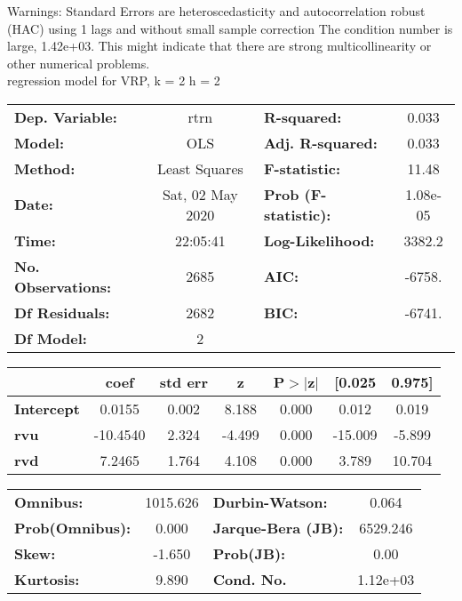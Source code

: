 Warnings: \newline
 [1] Standard Errors are heteroscedasticity and autocorrelation robust (HAC) using 1 lags and without small sample correction \newline
 [2] The condition number is large, 1.42e+03. This might indicate that there are \newline
 strong multicollinearity or other numerical problems.\\ 

regression model for VRP, k = 2 h = 2\begin{center}
\begin{tabular}{lclc}
\toprule
\textbf{Dep. Variable:}    &       rtrn       & \textbf{  R-squared:         } &     0.033   \\
\textbf{Model:}            &       OLS        & \textbf{  Adj. R-squared:    } &     0.033   \\
\textbf{Method:}           &  Least Squares   & \textbf{  F-statistic:       } &     11.48   \\
\textbf{Date:}             & Sat, 02 May 2020 & \textbf{  Prob (F-statistic):} &  1.08e-05   \\
\textbf{Time:}             &     22:05:41     & \textbf{  Log-Likelihood:    } &    3382.2   \\
\textbf{No. Observations:} &        2685      & \textbf{  AIC:               } &    -6758.   \\
\textbf{Df Residuals:}     &        2682      & \textbf{  BIC:               } &    -6741.   \\
\textbf{Df Model:}         &           2      & \textbf{                     } &             \\
\bottomrule
\end{tabular}
\begin{tabular}{lcccccc}
                   & \textbf{coef} & \textbf{std err} & \textbf{z} & \textbf{P$> |$z$|$} & \textbf{[0.025} & \textbf{0.975]}  \\
\midrule
\textbf{Intercept} &       0.0155  &        0.002     &     8.188  &         0.000        &        0.012    &        0.019     \\
\textbf{rvu}       &     -10.4540  &        2.324     &    -4.499  &         0.000        &      -15.009    &       -5.899     \\
\textbf{rvd}       &       7.2465  &        1.764     &     4.108  &         0.000        &        3.789    &       10.704     \\
\bottomrule
\end{tabular}
\begin{tabular}{lclc}
\textbf{Omnibus:}       & 1015.626 & \textbf{  Durbin-Watson:     } &    0.064  \\
\textbf{Prob(Omnibus):} &   0.000  & \textbf{  Jarque-Bera (JB):  } & 6529.246  \\
\textbf{Skew:}          &  -1.650  & \textbf{  Prob(JB):          } &     0.00  \\
\textbf{Kurtosis:}      &   9.890  & \textbf{  Cond. No.          } & 1.12e+03  \\
\bottomrule
\end{tabular}
\end{center}

